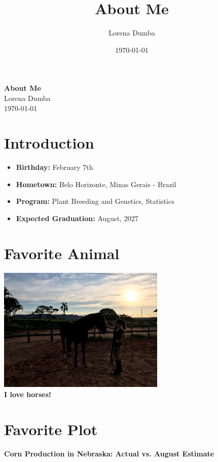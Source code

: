 \documentclass{article}
\title{About Me}
\author{Lorena Dumba}
\date{\today}
\begin{document}
\begin{center}
    \huge{\textbf{About Me}}\\
    \vspace{1cm}
    \Large{Lorena Dumba}\\
    \vspace{0.5cm}
    \large{\today}
\end{center}
\newpage

\section*{Introduction}
\begin{itemize}
    \item \textbf{Birthday:} February 7th
    \item \textbf{Hometown:} Belo Horizonte, Minas Gerais - Brazil
    \item \textbf{Program:} Plant Breeding and Genetics, Statistics
    \item \textbf{Expected Graduation:} August, 2027
\end{itemize}
\newpage

\section*{Favorite Animal}
\begin{center}
    \includegraphics[width=0.6\textwidth]{horse.png}\\
    \vspace{0.5cm}
    \textbf{I love horses!}
\end{center}
\newpage

\section*{Favorite Plot}

\begin{center}
    \textbf{Corn Production in Nebraska: Actual vs. August Estimate}
\end{center}
\end{document}
